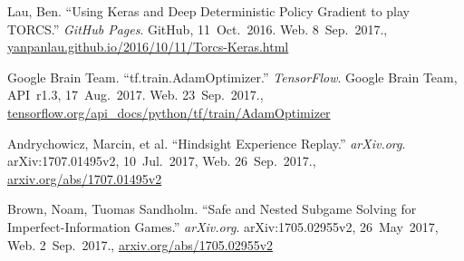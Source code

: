 \documentclass[a4paper,titlepage]{article}
\begin{document}
\begin{thebibliography}{99}
  Lau, Ben. ``Using Keras and Deep Deterministic Policy Gradient to play TORCS.'' \emph{GitHub Pages}. GitHub, 11~Oct.~2016. Web.
  8~Sep.~2017.,
  \url{yanpanlau.github.io/2016/10/11/Torcs-Keras.html}

  Google Brain Team. ``tf.train.AdamOptimizer.'' \emph{TensorFlow}. Google Brain Team, API~r1.3, 17~Aug.~2017. Web.
  23~Sep.~2017.,
  \url{tensorflow.org/api_docs/python/tf/train/AdamOptimizer}

  Andrychowicz, Marcin, et al. ``Hindsight Experience Replay.'' \emph{arXiv.org}. arXiv:1707.01495v2, 10~Jul.~2017, Web.
  26~Sep.~2017.,
  \url{arxiv.org/abs/1707.01495v2}

  Brown, Noam, Tuomas Sandholm. ``Safe and Nested Subgame Solving for Imperfect-Information Games.'' \emph{arXiv.org}. arXiv:1705.02955v2, 26~May~2017, Web. 2~Sep.~2017.,
  \url{arxiv.org/abs/1705.02955v2}

\end{thebibliography}
\end{document}
